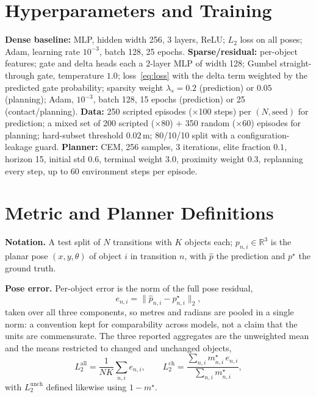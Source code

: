 \documentclass[conference]{IEEEtran}
\begin{document}
\section{Hyperparameters and Training}\label{app:hyper}
\textbf{Dense baseline:} MLP, hidden width 256, 3 layers, ReLU; $L_2$ loss on all
poses; Adam, learning rate $10^{-3}$, batch 128, 25 epochs. \textbf{Sparse/residual:}
per-object features; gate and delta heads each a 2-layer MLP of width 128; Gumbel
straight-through gate, temperature $1.0$; loss~\eqref{eq:loss} with the delta term
weighted by the predicted gate probability; sparsity weight $\lambda_s{=}0.2$
(prediction) or $0.05$ (planning); Adam, $10^{-3}$, batch 128, 15 epochs (prediction)
or 25 (contact/planning). \textbf{Data:} 250 scripted episodes ($\times$100 steps) per
$(N,\text{seed})$ for prediction; a mixed set of 200 scripted ($\times$80) $+$ 350
random ($\times$60) episodes for planning; hard-subset threshold $0.02$\,m; 80/10/10
split with a configuration-leakage guard. \textbf{Planner:} CEM, 256 samples, 3
iterations, elite fraction $0.1$, horizon 15, initial std $0.6$, terminal weight $3.0$,
proximity weight $0.3$, replanning every step, up to 60 environment steps per episode.

\section{Metric and Planner Definitions}\label{app:defs}
\textbf{Notation.} A test split of $N$ transitions with $K$ objects each;
$p_{n,i}\in\mathbb{R}^3$ is the planar pose $(x,y,\theta)$ of object $i$ in transition
$n$, with $\hat p$ the prediction and $p^\star$ the ground truth.

\textbf{Pose error.} Per-object error is the norm of the full pose residual,
\begin{equation}
  e_{n,i} = \lVert \hat p_{n,i} - p^\star_{n,i} \rVert_2 ,
\end{equation}
taken over all three components, so metres and radians are pooled in a single norm: a
convention kept for comparability across models, not a claim that the units are
commensurate. The three reported aggregates are the unweighted mean and the means
restricted to changed and unchanged objects,
\begin{equation}
  L_2^{\text{all}} = \frac{1}{NK}\sum_{n,i} e_{n,i},
  \qquad
  L_2^{\text{ch}} = \frac{\sum_{n,i} m^\star_{n,i}\, e_{n,i}}{\sum_{n,i} m^\star_{n,i}},
\end{equation}
with $L_2^{\text{unch}}$ defined likewise using $1-m^\star$.
\end{document}
